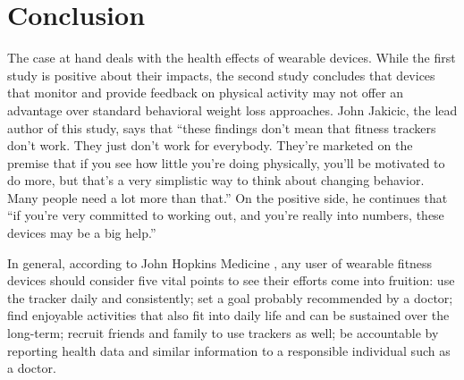 \section{Conclusion}
The case at hand deals with the health effects of wearable devices. While the first study is positive about their impacts, the second study concludes that devices that monitor and provide feedback on physical activity may not offer an advantage over standard behavioral weight loss approaches. John Jakicic, the lead author of this study, says that ``these findings don’t mean that fitness trackers don’t work. They just don’t work for everybody. They’re marketed on the premise that if you see how little you’re doing physically, you’ll be motivated to do more, but that’s a very simplistic way to think about changing behavior. Many people need a lot more than that.'' On the positive side, he continues that ``if you’re very committed to working out, and you’re really into numbers, these devices may be a big help.'' \cite{ref07}

In general, according to John Hopkins Medicine \cite{ref04}, any user of wearable fitness devices should consider five vital points to see their efforts come into fruition: use the tracker daily and consistently; set a goal probably recommended by a doctor; find enjoyable activities that also fit into daily life and can be sustained over the long-term; recruit friends and family to use trackers as well; be accountable by reporting health data and similar information to a responsible individual such as a doctor.
